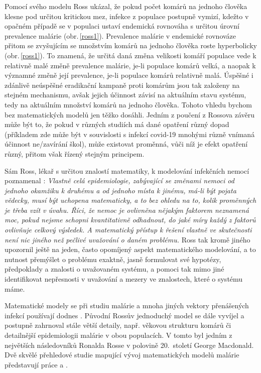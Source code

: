 Pomocí svého modelu \cite{Smith_etal2012} Ross ukázal, že pokud počet komárů na jednoho člověka klesne pod určitou kritickou mez, infekce z populace postupně vymizí, kdežto v opačném případě se v populaci ustaví endemická rovnováha s určitou úrovní prevalence malárie (obr.\,\ref{ross1}). Prevalence malárie v endemické rovnováze přitom se zvyšujícím se množstvím komárů na jednoho člověka roste hyperbolicky (obr.\,\ref{ross1}). To znamená, že určitá daná změna velikosti komáří populace vede k relativně malé změně prevalence malárie, je-li populace komárů velká, a naopak k významné změně její prevalence, je-li populace komárů relativně malá. Úspěšné i zdánlivě neúspěšné eradikační kampaně proti komárům jsou tak založeny na stejném mechanismu, avšak jejich účinnost závisí na aktuálním stavu systému, tedy na aktuálním množství komárů na jednoho člověka. Tohoto vhledu bychom bez matematických modelů jen těžko dosáhli. Jedním z poučení z Rossova závěru může být to, že pokud v různých studiích má dané opatření různý dopad (příkladem zde může být v souvislosti s infekcí covid-19 mnohými různě vnímaná účinnost ne/zavírání škol), může existovat proměnná, vůči níž je efekt opatření různý, přitom však řízený stejným principem. 

Sám Ross, lékař s určitou znalostí matematiky, k modelování infekčních nemocí poznamenal \cite{Bacaer2011}: \emph{Vlastně celá epidemiologie, zabývající se změnami nemoci od jednoho okamžiku k druhému a od jednoho místa k jinému, má-li být pojata vědecky, musí být uchopena matematicky, a to bez ohledu na to, kolik proměnných je třeba vzít v úvahu. Říci, že nemoc je ovlivněna nějakým faktorem neznamená moc, pokud nejsme schopni kvantitativně odhadnout, do jaké míry každý z faktorů ovlivňuje celkový výsledek. A matematický přístup k řešení vlastně ve skutečnosti není nic jiného než pečlivé uvažování o daném problému.} Ross tak kromě jiného upozornil ještě na jeden, často opomíjený aspekt matematického modelování, a to nutnost přemýšlet o problému exaktně, jasně formulovat své hypotézy, předpoklady a znalosti o uvažovaném systému, a pomoci tak mimo jiné identifikovat nepřesnosti v uvažování a mezery ve znalostech, které o systému máme.     

Matematické modely se při studiu malárie a mnoha jiných vektory přenášených infekcí používají dodnes \cite{Gratz1999,Reiner_etal2012}. Původní Rossův jednoduchý model se dále vyvíjel a postupně zahrnoval stále větší detaily, např. věkovou strukturu komárů či detailnější epidemiologii malárie v obou populacích. V tomto byl jedním z největších následovníků Ronalda Rosse v polovině 20.\ století George Macdonald. Dvě skvělé přehledové studie mapující vývoj matematických modelů malárie představují práce \cite{Smith_etal2012} a \cite{Smith_etal2018}.

